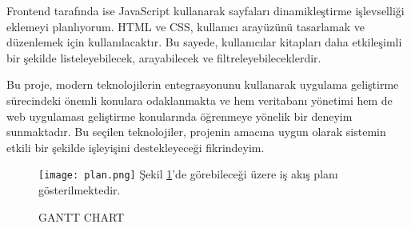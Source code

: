 Frontend tarafında ise JavaScript kullanarak sayfaları dinamikleştirme işlevselliği eklemeyi planlıyorum. HTML ve CSS, kullanıcı arayüzünü tasarlamak ve düzenlemek için kullanılacaktır. Bu sayede, kullanıcılar kitapları daha etkileşimli bir şekilde listeleyebilecek, arayabilecek ve filtreleyebileceklerdir.

Bu proje, modern teknolojilerin entegrasyonunu kullanarak uygulama geliştirme sürecindeki önemli konulara odaklanmakta ve hem veritabanı yönetimi hem de web uygulaması geliştirme konularında öğrenmeye yönelik bir deneyim sunmaktadır. Bu seçilen teknolojiler, projenin amacına uygun olarak sistemin etkili bir şekilde işleyişini destekleyeceği fikrindeyim.


	\begin{landscape}
\begin{figure}[h]
	\caption{GANTT CHART}
	\centering
	\texttt{[image: plan.png]}
	\label{gantt}
	Şekil  \ref{gantt}'de görebileceği üzere
	iş akış planı gösterilmektedir.
\end{figure}
\end{landscape}


